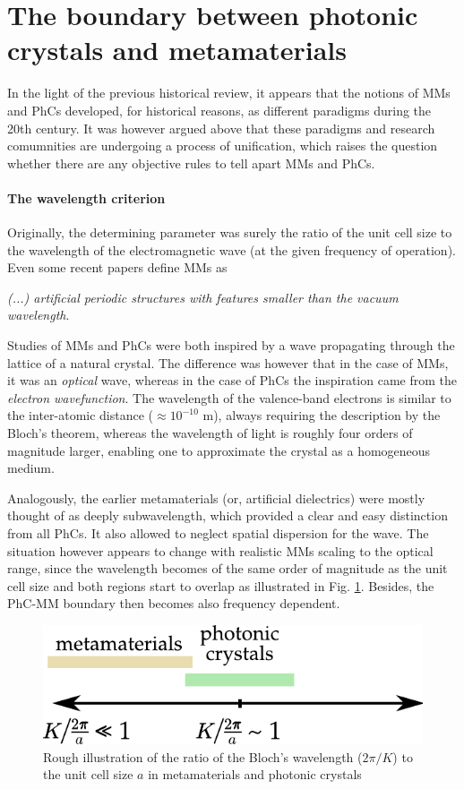 \section{The boundary between photonic crystals and metamaterials} %
In the light of the previous %
historical review, it appears that the notions of MMs and PhCs developed, for historical reasons, as different paradigms during the 20th century. It was however argued above that these paradigms and research comumnities are undergoing a process of unification, which raises the question whether there are any objective rules to tell apart MMs and PhCs.
\paragraph{The wavelength criterion} %
Originally, the determining parameter was surely the ratio of the unit cell size to the wavelength of the electromagnetic wave (at the given frequency of operation).
Even some recent papers \cite{tsukerman2011nonlocal} define MMs as 
\begin{displayquote}
\textit{(...) artificial periodic structures with features smaller than the vacuum wavelength}.
\end{displayquote}

Studies of MMs and PhCs were both inspired by a wave propagating through the lattice of a natural crystal. The difference was however that in the case of MMs, it was an \textit{optical} wave, whereas in the case of PhCs the inspiration came from the \textit{electron wavefunction}. The wavelength of the valence-band electrons is similar to the inter-atomic distance ($\approx 10^{-10}$ m), always requiring the description by the Bloch's theorem, whereas the wavelength of light is roughly four orders of magnitude larger, enabling one to approximate the crystal as a homogeneous medium.

Analogously, the earlier metamaterials (or, artificial dielectrics) were mostly thought of as deeply subwavelength, which provided a clear and easy distinction from all PhCs. It also allowed to neglect spatial dispersion for the wave. The situation however appears to change with realistic MMs scaling to the optical range, since the wavelength becomes of the same order of magnitude as the unit cell size and both regions start to overlap as illustrated in Fig. \ref{fg_mm_phc_diagram}. Besides, the PhC-MM boundary then becomes also frequency dependent.

\begin{figure}[h] \caption{Rough illustration of the ratio of the Bloch's wavelength ($2\pi/K$) to the unit cell size $a$ in metamaterials and photonic crystals} \label{fg_mm_phc_diagram} \centering \includegraphics[width=.4\textwidth]{img/mm-phc-diagram.pdf} \end{figure}
